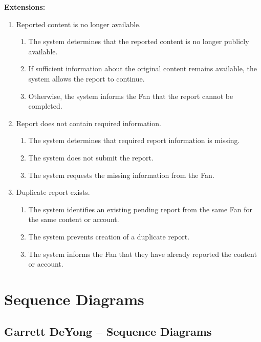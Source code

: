 \documentclass[11pt]{report}
\begin{document}
{\bfseries Extensions:}
\begin{enumerate}
    \item[3a.] Reported content is no longer available.
    \begin{enumerate}
        \item[3a1.] The system determines that the reported content is no longer publicly available.
        \item[3a2.] If sufficient information about the original content remains available, the system allows the report to continue.
        \item[3a3.] Otherwise, the system informs the Fan that the report cannot be completed.
    \end{enumerate}

    \item[6a.] Report does not contain required information.
    \begin{enumerate}
        \item[6a1.] The system determines that required report information is missing.
        \item[6a2.] The system does not submit the report.
        \item[6a3.] The system requests the missing information from the Fan.
    \end{enumerate}

    \item[7a.] Duplicate report exists.
    \begin{enumerate}
        \item[7a1.] The system identifies an existing pending report from the same Fan for the same content or account.
        \item[7a2.] The system prevents creation of a duplicate report.
        \item[7a3.] The system informs the Fan that they have already reported the content or account.
    \end{enumerate}
\end{enumerate}



\chapter{Sequence Diagrams}


\section{Garrett DeYong -- Sequence Diagrams}
\end{document}
